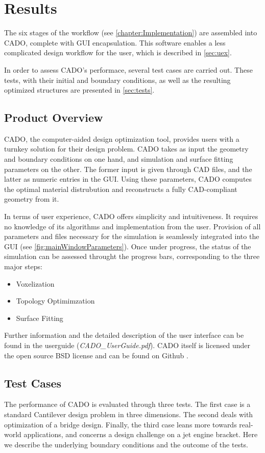 \chapter{Results}
The six stages of the workflow (see \autoref{chapter:Implementation}) are assembled into CADO, complete with GUI encapsulation. This software enables a less complicated design workflow for the user, which is described in \autoref{sec:uex}. 

In order to assess CADO's performace, several test cases are carried out. These tests, with their initial and boundary conditions, as well as the resulting optimized structures are presented in \autoref{sec:tests}.

\section{Product Overview}
\label{sec:uex}
CADO, the computer-aided design optimization tool, provides users with a turnkey solution for their design problem. CADO takes as input the geometry and boundary conditions on one hand, and simulation and surface fitting parameters on the other. The former input is given through CAD files, and the latter as numeric entries in the GUI. Using these parameters, CADO computes the optimal material distrubution and reconstructs a fully CAD-compliant geometry from it.

In terms of user experience, CADO offers simplicity and intuitiveness. It requires no knowledge of its algorithms and implementation from the user. Provision of all parameters and files necessary for the simulation is seamlessly integrated into the GUI (see \autoref{fig:mainWindowParameters}). Once under progress, the status of the simulation can be assessed throught the progress bars, corresponding to the three major steps:
\begin{itemize}
\item Voxelization
\item Topology Optimimzation
\item Surface Fitting
\end{itemize}
Further information and the detailed description of the user interface can be found in the userguide (\textit{CADO\_UserGuide.pdf}). CADO itself is licensed under the open source BSD license and can be found on Github \cite{CADOGit}.


\section{Test Cases}
\label{sec:tests}
The performance of CADO is evaluated through three tests. The first case is a standard Cantilever design problem in three dimensions. The second deals with optimization of a bridge design. Finally, the third case leans more towards real-world applications, and concerns a design challenge on a jet engine bracket. Here we describe the underlying boundary conditions and the outcome of the tests.

